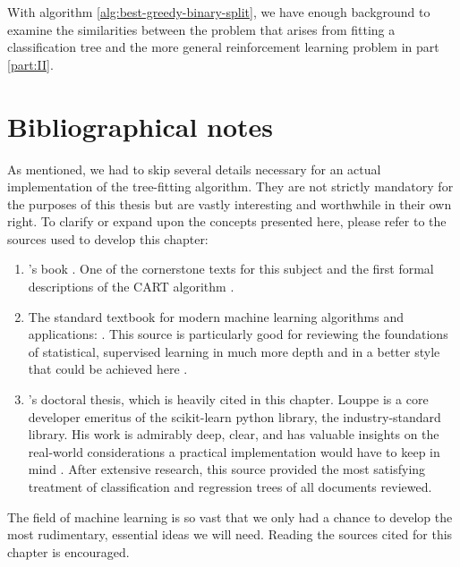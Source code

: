 With algorithm \ref{alg:best-greedy-binary-split}, we have enough background to
examine the similarities between the problem that arises from fitting a
classification tree and the more general reinforcement learning problem in part
\ref{part:II}.

\section{Bibliographical notes}
As mentioned, we had to skip several details necessary for an actual
implementation of the tree-fitting algorithm. They are not strictly mandatory
for the purposes of this thesis but are vastly interesting and worthwhile in
their own right. To clarify or expand upon the concepts presented here, please
refer to the sources used to develop this chapter:
\begin{enumerate}
    \item \citeauthor{breiman2017}'s book . One of the
        cornerstone texts for this subject and the first formal descriptions of
        the CART algorithm \cite{breiman2017}.
    \item The standard textbook for modern machine learning algorithms and
        applications: . This source is particularly good
        for reviewing the foundations of statistical, supervised learning in
        much more depth and in a better style that could be achieved here
        \cite{elements2009}.
    \item \citeauthor{louppe2014}'s doctoral thesis, which is heavily cited in
        this chapter. Louppe is a core developer emeritus of the scikit-learn
        python library, the industry-standard library. His work is admirably
        deep, clear, and has valuable insights on the real-world considerations
        a practical implementation would have to keep in mind \cite{louppe2014}.
        After extensive research, this source provided the most satisfying
        treatment of classification and regression trees of all documents
        reviewed.
\end{enumerate}

The field of machine learning is so vast that we only had a chance to develop
the most rudimentary, essential ideas we will need. Reading the sources cited
for this chapter is encouraged.